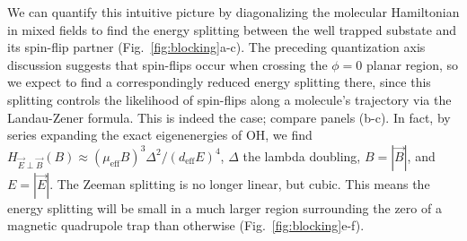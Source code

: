 \documentclass[%
 reprint,
 amsmath,amssymb,
 aps,
prl,
]{revtex4-1}
\newcommand{\epbm}{{\vec{E}\!\perp\!\vec{B}}}
\begin{document}
We can quantify this intuitive picture by diagonalizing the molecular Hamiltonian in mixed fields to find the energy splitting between the well trapped substate and its spin-flip partner (Fig.~\ref{fig:blocking}a-c). The preceding quantization axis discussion suggests that spin-flips occur when crossing the $\phi=0$ planar region, so we expect to find a correspondingly reduced energy splitting there, since this splitting controls the likelihood of spin-flips along a molecule's trajectory via the Landau-Zener formula. This is indeed the case; compare panels (b-c). In fact, by series expanding the exact eigenenergies of OH, we find $H_\epbm(B)\approx (\mu_\text{eff}B)^3\Delta^2/(d_\text{eff}E)^4$, $\Delta$ the lambda doubling, $B=|\vec{B}|$, and $E=|\vec{E}|$. The Zeeman splitting is no longer linear, but cubic. This means the energy splitting will be small in a much larger region surrounding the zero of a magnetic quadrupole trap than otherwise (Fig.~\ref{fig:blocking}e-f).


\end{document}
